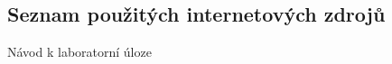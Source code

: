 \documentclass[a4paper,12pt]{article}   %
\begin{document}
\clearpage
\renewcommand{\refname}{Seznam použité literatury a~zdrojů informací} 

\begin{thebibliography}{99}

\subsection*{Seznam použitých internetových zdrojů}
     Návod k laboratorní úloze
    
\end{thebibliography}
\end{document}
